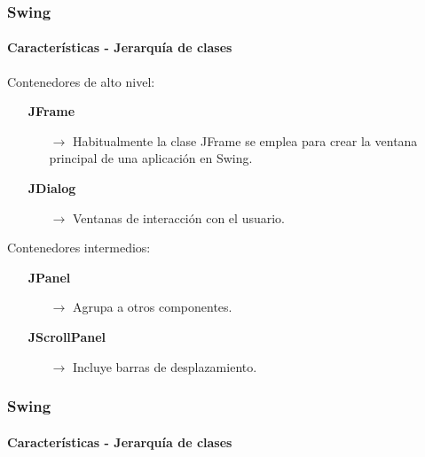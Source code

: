 \documentclass{beamer}
\begin{document}
	\begin{frame}
		\frametitle{Swing}
		\framesubtitle{Caracter\'isticas - Jerarqu\'ia de clases}
		
		Contenedores de alto nivel: 
		\begin{itemize}
		    \item[\checkmark] \textbf{JFrame}
		    \begin{itemize}
        		    \item[$\rightarrow$] Habitualmente la clase JFrame se emplea para crear la ventana principal de una aplicaci\'on en Swing.
        		\end{itemize}
		    \item[\checkmark] \textbf{JDialog}
		    \begin{itemize}
        		    \item[$\rightarrow$] Ventanas de interacci\'on con el usuario.
        		\end{itemize}        		
		\end{itemize}
		
		Contenedores intermedios: 
		\begin{itemize}
		    \item[\checkmark] \textbf{JPanel}
		    \begin{itemize}
        		    \item[$\rightarrow$] Agrupa a otros componentes.
        		\end{itemize}
		    \item[\checkmark] \textbf{JScrollPanel}
		    \begin{itemize}
        		    \item[$\rightarrow$] Incluye barras de desplazamiento.
        		\end{itemize}        		
		\end{itemize}
	\end{frame}

    \begin{frame}
		\frametitle{Swing}
		\framesubtitle{Caracter\'isticas - Jerarqu\'ia de clases}
		\begin{center}
		\end{center}
	\end{frame}
\end{document}
